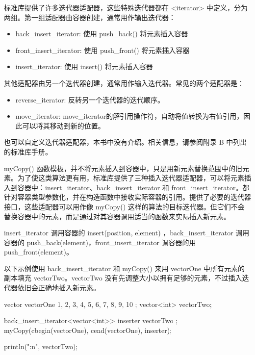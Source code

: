 
标准库提供了许多迭代器适配器，这些特殊迭代器都在 <iterator> 中定义，分为两组。第一组适配器由容器创建，通常用作输出迭代器：

\begin{itemize}
\item
back\_insert\_iterator: 使用 push\_back() 将元素插入容器

\item
front\_insert\_iterator: 使用 push\_front() 将元素插入容器

\item
insert\_iterator: 使用 insert() 将元素插入容器
\end{itemize}

其他适配器由另一个迭代器创建，通常用作输入迭代器。常见的两个适配器是：

\begin{itemize}
\item
reverse\_iterator: 反转另一个迭代器的迭代顺序。

\item
move\_iterator: move\_iterator的解引用操作符，自动将值转换为右值引用，因此可以将其移动到新的位置。
\end{itemize}

也可以自定义迭代器适配器，本书中没有介绍。相关信息，请参阅附录 B 中列出的标准库手册。


myCopy() 函数模板，并不将元素插入到容器中，只是用新元素替换范围中的旧元素。为了使这类算法更有用，标准库提供了三种插入迭代器适配器，可以将元素插入到容器中：insert\_iterator、back\_insert\_iterator 和 front\_insert\_iterator。都针对容器类型参数化，并在构造函数中接收实际容器的引用。提供了必要的迭代器接口，这些适配器可以用作像 myCopy() 这样的算法的目标迭代器。但它们不会替换容器中的元素，而是通过对其容器调用适当的函数来实际插入新元素。

insert\_iterator 调用容器的 insert(position, element) ，back\_insert\_iterator 调用容器的 push\_back(element)，front\_insert\_iterator 调容器的用 push\_front(element)。

以下示例使用 back\_insert\_iterator 和 myCopy() 来用 vectorOne 中所有元素的副本填充 vectorTwo。vectorTwo 没有先调整大小以拥有足够的元素，不过插入迭代器依旧会正确地插入新元素。

\begin{cpp}
vector vectorOne { 1, 2, 3, 4, 5, 6, 7, 8, 9, 10 };
vector<int> vectorTwo;

back_insert_iterator<vector<int>> inserter { vectorTwo };
myCopy(cbegin(vectorOne), cend(vectorOne), inserter);

println("{:n}", vectorTwo);
\end{cpp}

